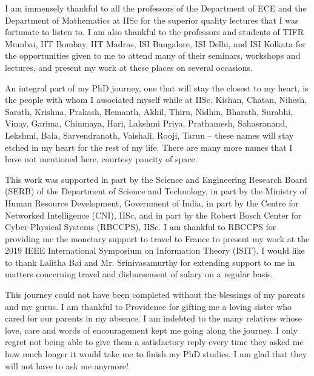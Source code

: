 I am immensely thankful to all the professors of the Department of ECE and the Department of Mathematics at IISc for the superior quality lectures that I was fortunate to listen to. I am also thankful to the professors and students of TIFR Mumbai, IIT Bombay, IIT Madras, ISI Bangalore, ISI Delhi, and ISI Kolkata for the opportunities given to me to attend many of their seminars, workshops and lectures, and present my work at these places on several occasions.

An integral part of my PhD journey, one that will stay the closest to my heart, is the people with whom I associated myself while at IISc. Kishan, Chatan, Nihesh, Sarath, Krishna, Prakash, Hemanth, Akhil, Thiru, Nidhin, Bharath, Surabhi, Vinay, Garima, Chinmaya, Hari, Lakshmi Priya, Prathamesh, Sahasranand, Lekshmi, Bala, Sarvendranath, Vaishali, Rooji, Tarun -- these names will stay etched in my heart for the rest of my life. There are many more names that I have not mentioned here, courtesy paucity of space. 

This work was supported in part by the Science and Engineering Research Board (SERB) of the Department of Science and Technology, in part by the Ministry of Human Resource Development, Government of India, in part by the Centre for Networked Intelligence (CNI), IISc, and in part by the Robert Bosch Center for Cyber-Physical Systems (RBCCPS), IISc. I am thankful to RBCCPS for providing me the monetary support to travel to France to present my work at the 2019 IEEE International Symposium on Information Theory (ISIT). I would like to thank Lalitha Bai and Mr. Srinivasamurthy for extending support to me in matters concerning travel and disbursement of salary on a regular basis. 

This journey could not have been completed without the blessings of my parents and my gurus. I am thankful to Providence for gifting me a loving sister who cared for our parents in my absence. I am indebted to the many relatives whose love, care and words of encouragement kept me going along the journey. I only regret not being able to give them a satisfactory reply every time they asked me how much longer it would take me to finish my PhD studies. I am glad that they will not have to ask me anymore! 









